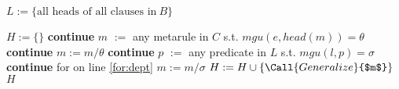 \begin{algorithmic}\footnotesize

        \State $L :=  \{ \text{all heads of all clauses in} ~ B \}$

        \label{for:dept} 
            \State $H := \{\}$ 
                    \textbf{continue}
                \EndIf
                    \State $m$ $:=$ any metarule in $C$ s.t. $\mathit{mgu}(e, \mathit{head}(m)) = \theta$ 
                    \If{$\theta \neq \Box$} 
                        \textbf{continue}
                    \EndIf
                    \State $m := m / \theta$
                            \textbf{continue}
                        \EndIf
                        \State $p$ $:=$ any predicate in $L$ s.t. $\mathit{mgu}(l, p) = \sigma$ 
                        \If{$\sigma \neq \Box$} 
                            \textbf{continue} for on line \ref{for:dept} 
                        \EndIf
                        \State $m := m / \sigma$
                    \EndFor
                    \State $H := H \cup \{ \Call{Generalize}{$m$} \}$ 
                \EndWhile
            \EndFor
                \State \Return $H$
            \EndIf
        \EndFor
    \EndFunction
\end{algorithmic}
